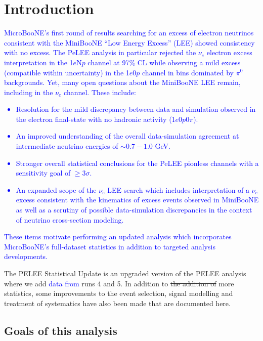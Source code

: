 \section{Introduction}
\label{sec:Introduction}

\textcolor{blue}{MicroBooNE's first round of results searching for an excess of electron neutrinos consistent with the MiniBooNE ``Low Energy Excess'' (LEE) showed consistency with no excess. The PeLEE analysis in particular rejected the $\nu_e$ electron excess interpretation in the 1$e$N$p$ channel at 97\% CL while observing a mild excess (compatible within uncertainty) in the 1$e$0$p$ channel in bins dominated by $\pi^0$ backgrounds. Yet, many open questions about the MiniBooNE LEE remain, including in the $\nu_e$ channel. These include:
\begin{itemize}
    \item Resolution for the mild discrepancy between data and simulation observed in the electron final-state with no hadronic activity (1$e$0$p$0$\pi$).
    \item An improved understanding of the overall data-simulation agreement at intermediate neutrino energies of $\sim0.7-1.0$ GeV.
    \item Stronger overall statistical conclusions for the PeLEE pionless channels with a sensitivity goal of $\geq 3\sigma$.
    \item An expanded scope of the $\nu_e$ LEE search which includes interpretation of a $\nu_e$ excess consistent with the kinematics of excess events observed in MiniBooNE as well as a scrutiny of possible data-simulation discrepancies in the context of neutrino cross-section modeling.
\end{itemize}
These items motivate performing an updated analysis which incorporates MicroBooNE's full-dataset statistics in addition to targeted analysis developments.
}

The PELEE Statistical Update is an upgraded version of the PELEE analysis where we add \textcolor{blue}{data from} runs 4 and 5. In addition to \sout{the addition of} more statistics, some improvements to the event selection, signal modelling and treatment of systematics have also been made that are documented here. 

\subsection{Goals of this analysis}
\label{sec:Goals}


